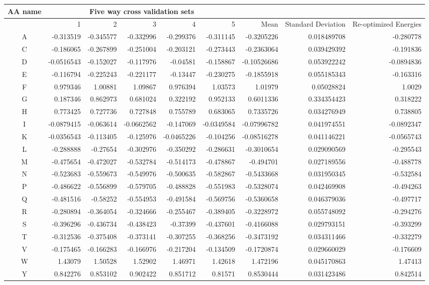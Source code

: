 \begin{tabular}{|c|r|r|r|r|r|r|r|r|}
\hline
 AA name & \multicolumn{5}{c|}{Five way cross validation sets} & & &  \\
\hline
 & 1 & 2 & 3 & 4 & 5 & Mean & Standard Deviation & Re-optimized Energies \\
\hline
A & -0.313519 & -0.345577 & -0.332996 & -0.299376 & -0.311145 & -0.3205226 & 0.018489708 & -0.280778\\
\hline
C & -0.186065 & -0.267899 & -0.251004 & -0.203121 & -0.273443 & -0.2363064 & 0.039429392 & -0.191836\\
\hline
D & -0.0516543 & -0.152027 & -0.117976 & -0.04581 & -0.158867 & -0.10526686 & 0.053922242 & -0.0894836\\
\hline
E & -0.116794 & -0.225243 & -0.221177 & -0.13447 & -0.230275 & -0.1855918 & 0.055185343 & -0.163316\\
\hline
F & 0.979346 & 1.00881 & 1.09867 & 0.976394 & 1.03573 & 1.01979 & 0.05028824 & 1.0029\\
\hline
G & 0.187346 & 0.862973 & 0.681024 & 0.322192 & 0.952133 & 0.6011336 & 0.334354423 & 0.318222\\
\hline
H & 0.773425 & 0.727736 & 0.727848 & 0.755789 & 0.683065 & 0.7335726 & 0.034276949 & 0.738805\\
\hline
I & -0.0879415 & -0.063614 & -0.0662562 & -0.147069 & -0.0349584 & -0.07996782 & 0.041974551 & -0.0892347\\
\hline
K & -0.0356543 & -0.113405 & -0.125976 & -0.0465226 & -0.104256 & -0.08516278 & 0.041146221 & -0.0565743\\
\hline
L & -0.288888 & -0.27654 & -0.302976 & -0.350292 & -0.286631 & -0.3010654 & 0.029090569 & -0.295543\\
\hline
M & -0.475654 & -0.472027 & -0.532784 & -0.514173 & -0.478867 & -0.494701 & 0.027189556 & -0.488778\\
\hline
N & -0.523683 & -0.559673 & -0.549976 & -0.500635 & -0.582867 & -0.5433668 & 0.031950345 & -0.532584\\
\hline
P & -0.486622 & -0.556899 & -0.579705 & -0.488828 & -0.551983 & -0.5328074 & 0.042469908 & -0.494263\\
\hline
Q & -0.481516 & -0.58252 & -0.554953 & -0.491584 & -0.569756 & -0.5360658 & 0.046379036 & -0.497717\\
\hline
R & -0.280894 & -0.364054 & -0.324666 & -0.255467 & -0.389405 & -0.3228972 & 0.055748092 & -0.294276\\
\hline
S & -0.396296 & -0.436734 & -0.438423 & -0.37399 & -0.437601 & -0.4166088 & 0.029793151 & -0.393299\\
\hline
T & -0.312536 & -0.375408 & -0.373141 & -0.307255 & -0.368256 & -0.3473192 & 0.034311466 & -0.332279\\
\hline
V & -0.175465 & -0.166283 & -0.166976 & -0.217204 & -0.134509 & -0.1720874 & 0.029660029 & -0.176609\\
\hline
W & 1.43079 & 1.50528 & 1.52902 & 1.46971 & 1.42618 & 1.472196 & 0.045170863 & 1.47413\\
\hline
Y & 0.842276 & 0.853102 & 0.902422 & 0.851712 & 0.81571 & 0.8530444 & 0.031423486 & 0.842514\\
\hline

\end{tabular}
